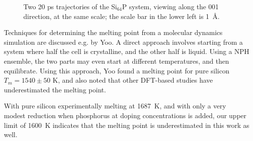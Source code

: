 \documentclass[11pt,bibliography=totoc,index=totoc]{scrbook}   %
\begin{document}
\begin{figure}[htbp]
    \begin{center}
    \end{center}
    \caption{Two 20 ps trajectories of the Si$_{64}$P system, viewing along the 001 direction, at the same scale; the scale bar in the lower left is 1~Å.}
    \label{fig:dance}
\end{figure}

Techniques for determining the melting point from a molecular dynamics simulation are discussed e.g. by Yoo.\cite{Yoo:2009} 
A direct approach involves starting from a system where half the cell is crystalline, and the other half is liquid. 
Using a NPH ensemble, the two parts may even start at different temperatures, and then equilibrate. 
Using this approach, Yoo found a melting point for pure silicon $T_m = 1540 \pm 50$ K, and also noted that other DFT-based studies have 
underestimated the melting point.\cite{Yoo:2009}

With pure silicon experimentally melting at \SI{1687}{\kelvin}, and with only a very modest reduction when phosphorus at doping concentrations is added,\cite{Safarian:2011} our upper limit of \SI{1600}{\kelvin} indicates that the melting point is underestimated in this work as well.
\end{document}
